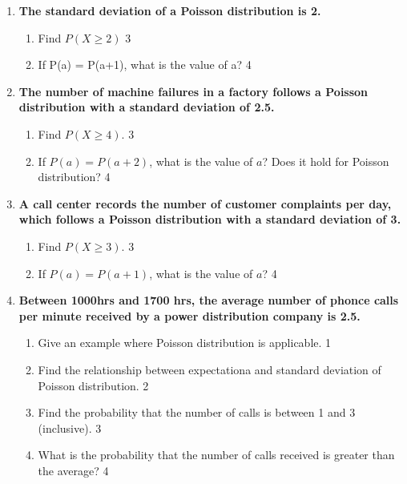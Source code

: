\documentclass[a4paper,oneside, margin=1.4in]{book}
\begin{document}
\begin{enumerate}

 \item
	  \textbf{The standard deviation of a Poisson distribution is 2.} 
  
  \begin{enumerate}
    \item  
	Find $P(X\ge 2)$ \hfill 3
    \item
	If P(a) = P(a+1), what is the value of a? \hfill 4
  \end{enumerate}
  
  \item  
  \textbf{The number of machine failures in a factory follows a Poisson distribution with a standard deviation of 2.5.}  

  \begin{enumerate}  
    \item  
      Find $P(X \geq 4)$. \hfill 3  
    \item  
      If $P(a) = P(a+2)$, what is the value of $a$? Does it hold for Poisson distribution?  \hfill 4  
  \end{enumerate}  

\item  
  \textbf{A call center records the number of customer complaints per day, which follows a Poisson distribution with a standard deviation of 3.}  

  \begin{enumerate}  
    \item  
      Find $P(X \geq 3)$. \hfill 3  
    \item  
      If $P(a) = P(a+1)$, what is the value of $a$? \hfill 4  
  \end{enumerate}  


   \item
	  \textbf{Between 1000hrs and 1700 hrs, the average number of phonce calls per minute received by a power distribution company is 2.5. } 
  
  \begin{enumerate}
    \item
	Give an example where Poisson distribution is applicable. \hfill 1
    \item
	Find the relationship between expectationa and standard deviation of Poisson distribution. \hfill 2
    \item  
	Find the probability that the number of calls is between 1 and 3 (inclusive). \hfill 3
    \item
	What is the probability that the number of calls received is greater than the average? \hfill 4
  \end{enumerate}
  

\end{enumerate}
\end{document}
